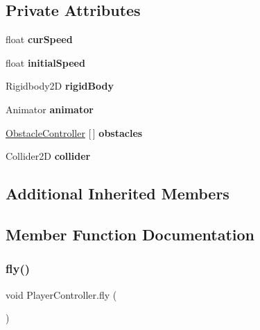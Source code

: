 \subsection*{Private Attributes}
\begin{DoxyCompactItemize}
\item 
\hypertarget{class_player_controller_a878e62a8ad20bb41eea63e120ed814bf}{}\label{class_player_controller_a878e62a8ad20bb41eea63e120ed814bf} 
float {\bfseries cur\+Speed}
\item 
\hypertarget{class_player_controller_ae04ab7d27ef4b52b7cac3d726ef9ef18}{}\label{class_player_controller_ae04ab7d27ef4b52b7cac3d726ef9ef18} 
float {\bfseries initial\+Speed}
\item 
\hypertarget{class_player_controller_a9721b8d04bb06ef1f2d9f5a3b56c0353}{}\label{class_player_controller_a9721b8d04bb06ef1f2d9f5a3b56c0353} 
Rigidbody2D {\bfseries rigid\+Body}
\item 
\hypertarget{class_player_controller_af24a8820ce6558138208255b27d948d3}{}\label{class_player_controller_af24a8820ce6558138208255b27d948d3} 
Animator {\bfseries animator}
\item 
\hypertarget{class_player_controller_ae31af3983fc963c06c166d153ffb2001}{}\label{class_player_controller_ae31af3983fc963c06c166d153ffb2001} 
\hyperlink{class_obstacle_controller}{Obstacle\+Controller} \mbox{[}$\,$\mbox{]} {\bfseries obstacles}
\item 
\hypertarget{class_player_controller_a963a11fda8fc769eb0f7a5de383d81c4}{}\label{class_player_controller_a963a11fda8fc769eb0f7a5de383d81c4} 
Collider2D {\bfseries collider}
\end{DoxyCompactItemize}
\subsection*{Additional Inherited Members}


\subsection{Member Function Documentation}
\hypertarget{class_player_controller_aee6bf52d3f0ca89147606cccd433a59f}{}\label{class_player_controller_aee6bf52d3f0ca89147606cccd433a59f} 
\subsubsection{\texorpdfstring{fly()}{fly()}}
{\footnotesize\ttfamily void Player\+Controller.\+fly (\begin{DoxyParamCaption}{ }\end{DoxyParamCaption})\hspace{0.3cm}{\ttfamily [private]}}



